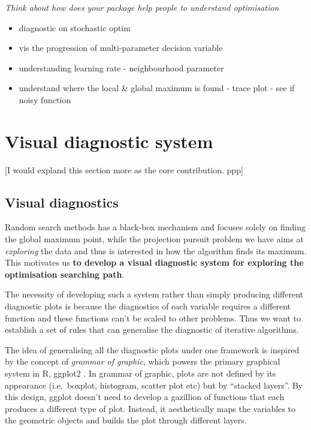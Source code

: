 \documentclass[12pt]{article}
\providecommand{\tightlist}{%
  \setlength{\itemsep}{0pt}\setlength{\parskip}{0pt}}
\begin{document}
\emph{Think about how does your package help people to understand
optimisation}

\begin{itemize}
\tightlist
\item
  diagnostic on stochastic optim
\item
  vis the progression of multi-parameter decision variable
\item
  understanding learning rate - neighbourhood parameter
\item
  understand where the local \& global maximum is found - trace plot -
  see if noisy function
\end{itemize}

\hypertarget{vis-diag}{%
\section{Visual diagnostic system}\label{vis-diag}}

{[}I would expland this section more as the core contribution. ppp{]}

\hypertarget{visual-diagnostics}{%
\subsection{Visual diagnostics}\label{visual-diagnostics}}

Random search methods has a black-box mechanism and focuses solely on
finding the global maximum point, while the projection pursuit problem
we have aims at \emph{exploring} the data and thus is interested in how
the algorithm finds its maximum. This motivates us \textbf{to develop a
visual diagnostic system for exploring the optimisation searching path}.

The necessity of developing such a system rather than simply producing
different diagnostic plots is because the diagnostics of each variable
requires a different function and these functions can't be scaled to
other problems. Thus we want to establish a set of rules that can
generalise the diagnostic of iterative algorithms.

The idea of generalising all the diagnostic plots under one framework is
inspired by the concept of \emph{grammar of
graphic}\citep{wickham2010layered}, which powers the primary graphical
system in R, ggplot2 \citep{ggplot2}. In grammar of graphic, plots are
not defined by its appearance (i.e.~boxplot, histogram, scatter plot
etc) but by ``stacked layers''. By this design, ggplot doesn't need to
develop a gazillion of functions that each produces a different type of
plot. Instead, it aesthetically maps the variables to the geometric
objects and builds the plot through different layers.
\end{document}
